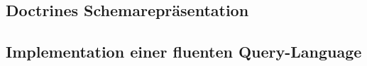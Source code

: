 \subsection{Doctrines Schemarepräsentation}

\subsection{Implementation einer fluenten Query-Language}

